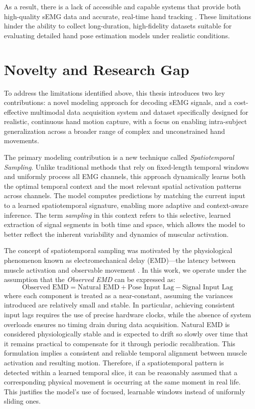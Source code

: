 As a result, there is a lack of accessible and capable systems that provide both high-quality sEMG data and accurate, real-time hand tracking \cite{graf2023combining}. These limitations hinder the ability to collect long-duration, high-fidelity datasets suitable for evaluating detailed hand pose estimation models under realistic conditions.

\section{Novelty and Research Gap}

To address the limitations identified above, this thesis introduces two key contributions: a novel modeling approach for decoding sEMG signals, and a cost-effective multimodal data acquisition system and dataset specifically designed for realistic, continuous hand motion capture, with a focus on enabling intra-subject generalization across a broader range of complex and unconstrained hand movements.

The primary modeling contribution is a new technique called \textit{Spatiotemporal Sampling}. Unlike traditional methods that rely on fixed-length temporal windows and uniformly process all EMG channels, this approach dynamically learns both the optimal temporal context and the most relevant spatial activation patterns across channels. The model computes predictions by matching the current input to a learned spatiotemporal signature, enabling more adaptive and context-aware inference. The term \textit{sampling} in this context refers to this selective, learned extraction of signal segments in both time and space, which allows the model to better reflect the inherent variability and dynamics of muscular activation.

The concept of spatiotemporal sampling was motivated by the physiological phenomenon known as electromechanical delay (EMD)—the latency between muscle activation and observable movement \cite{ngeo2014continuous}. In this work, we operate under the assumption that the \textit{Observed EMD} can be expressed as:
\[
\text{Observed EMD} = \text{Natural EMD} + \text{Pose Input Lag} - \text{Signal Input Lag}
\]
where each component is treated as a near-constant, assuming the variances introduced are relatively small and stable. In particular, achieving consistent input lags requires the use of precise hardware clocks, while the absence of system overloads ensures no timing drain during data acquisition. Natural EMD is considered physiologically stable and is expected to drift so slowly over time that it remains practical to compensate for it through periodic recalibration. This formulation implies a consistent and reliable temporal alignment between muscle activation and resulting motion. Therefore, if a spatiotemporal pattern is detected within a learned temporal slice, it can be reasonably assumed that a corresponding physical movement is occurring at the same moment in real life. This justifies the model's use of focused, learnable windows instead of uniformly sliding ones.

